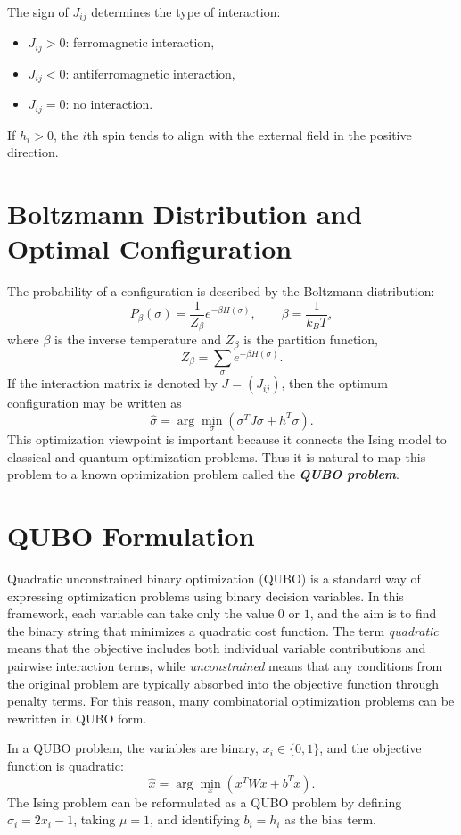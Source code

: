 \documentclass[english,12pt,a4paper]{report}
\begin{document}
	The sign of $J_{ij}$ determines the type of interaction:
	\begin{itemize}
		\item $J_{ij}>0$: ferromagnetic interaction,
		\item $J_{ij}<0$: antiferromagnetic interaction,
		\item $J_{ij}=0$: no interaction.
	\end{itemize}
	If $h_i>0$, the $i$th spin tends to align with the external field in the positive direction.
	
	\section{Boltzmann Distribution and Optimal Configuration}
	\hspace{1.15em}The probability of a configuration is described by the Boltzmann distribution:
	\[
	P_\beta(\sigma)=\frac{1}{Z_\beta}e^{-\beta H(\sigma)}, \qquad \beta=\frac{1}{k_B T},
	\]
	where $\beta$ is the inverse temperature and $Z_\beta$ is the partition function,
	\[
	Z_\beta = \sum_{\sigma}e^{-\beta H(\sigma)}.
	\]
	If the interaction matrix is denoted by $J=(J_{ij})$, then the optimum configuration may be written as
	\[
	\hat{\sigma}=\arg\min_{\sigma}(\sigma^T J\sigma + h^T\sigma).
	\]
	This optimization viewpoint is important because it connects the Ising model to classical and quantum optimization problems. Thus it is natural to map this problem to a known optimization problem called the \emph{\textbf{QUBO problem}}.
	
	\section{QUBO Formulation}\label{QUBO}
	\hspace{1.15em}Quadratic unconstrained binary optimization (QUBO) is a standard way of expressing optimization problems using binary decision variables. In this framework, each variable can take only the value $0$ or $1$, and the aim is to find the binary string that minimizes a quadratic cost function. The term \emph{quadratic} means that the objective includes both individual variable contributions and pairwise interaction terms, while \emph{unconstrained} means that any conditions from the original problem are typically absorbed into the objective function through penalty terms. For this reason, many combinatorial optimization problems can be rewritten in QUBO form. 
	
	In a QUBO problem, the variables are binary, $x_i\in \{0,1\}$, and the objective function is quadratic:
	\[
	\hat{x}=\arg\min_x(x^T W x + b^T x).
	\]
	The Ising problem can be reformulated as a QUBO problem by defining $\sigma_i=2x_i-1$, taking $\mu=1$, and identifying $b_i=h_i$ as the bias term.
	
\end{document}
